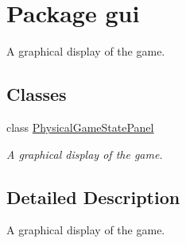 \hypertarget{namespacegui}{
\section{Package gui}
\label{namespacegui}
}


A graphical display of the game.  


\subsection*{Classes}
\begin{DoxyCompactItemize}
\item 
class \hyperlink{classgui_1_1_physical_game_state_panel}{PhysicalGameStatePanel}
\begin{DoxyCompactList}\small\item\em A graphical display of the game. \end{DoxyCompactList}\end{DoxyCompactItemize}


\subsection{Detailed Description}
A graphical display of the game. 